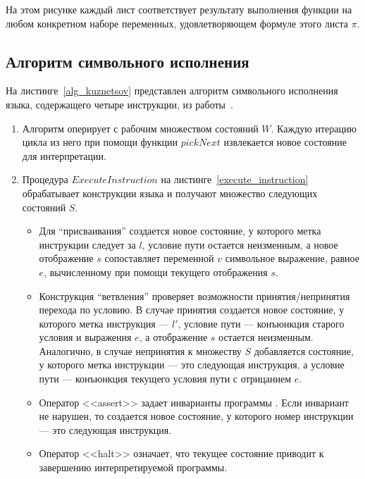 На этом рисунке каждый лист соответствует результату выполнения функции на любом конкретном наборе переменных, удовлетворяющем формуле этого листа $\pi$.

\subsection{Алгоритм символьного исполнения}
На листинге~\ref{alg_kuznetsov} представлен алгоритм символьного исполнения языка, содержащего четыре инструкции, из работы~\cite{kuznetsov2012efficient}.
\begin{enumerate}
    \item Алгоритм оперирует с рабочим множеством состояний $W$. Каждую итерацию цикла  из него при помощи функции $pickNext$ извлекается новое состояние для интерпретации.
    \item Процедура $ExecuteInstruction$ на листинге~\ref{execute_instruction} обрабатывает конструкции языка и получают множество следующих состояний $S$.
        \begin{itemize}
            \item Для ``присваивания'' создается новое состояние, у которого метка инструкции следует за $l$, условие пути остается неизменным, а новое отображение $s$ 
            сопоставляет переменной $v$ символьное выражение, равное $e$, вычисленному при помощи текущего отображения $s$.
            \item Конструкция ``ветвления'' проверяет возможности принятия/непринятия перехода по условию. В случае принятия создается новое состояние, у которого метка инструкция --- $l'$, условие пути --- конъюнкция старого условия и выражения $e$, а отображение $s$ остается неизменным. Аналогично, в случае непринятия к множеству $S$ добавляется состояние, у которого метка инструкции --- это следующая инструкция, а условие пути --- конъюнкция текущего условия пути с отрицанием $e$.
            \item Оператор <<assert>> задает инварианты программы . Если инвариант не нарушен, то создается новое состояние, у которого номер инструкции --- это следующая инструкция.
            \item Оператор <<halt>> означает, что текущее состояние приводит к завершению интерпретируемой программы.
        \end{itemize}

\end{enumerate}
